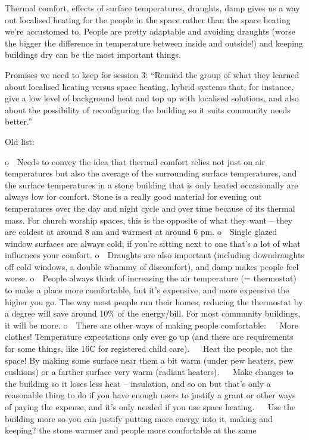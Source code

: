 \documentclass[letterpaper,10pt,english]{jupyterBook}
\begin{document}
\sphinxAtStartPar
Thermal comfort, effects of surface temperatures, draughts, damp \sphinxhyphen{} gives us a way out \sphinxhyphen{} localised heating for the people in the space rather than the space heating we’re accustomed to.  People are pretty adaptable and avoiding draughts (worse the bigger the difference in temperature between inside and outside!) and keeping buildings dry can be the most important things.

\sphinxAtStartPar
Promises we need to keep for session 3: “Remind the group of what they learned about localised heating versus space heating, hybrid systems that, for instance, give a low level of background heat and top up with localised solutions, and also about the possibility of reconfiguring the building so it suits community needs better.”

\sphinxAtStartPar
Old list:

\sphinxAtStartPar
o Needs to convey the idea that thermal comfort relies not just on air temperatures but also the average of the surrounding surface temperatures, and the surface temperatures in a stone building that is only heated occasionally are always low for comfort.  Stone is a really good material for evening out temperatures over the day and night cycle and over time because of its thermal mass.  For church worship spaces, this is the opposite of what they want – they are coldest at around 8 am and warmest at around 6 pm.
o Single glazed window surfaces are always cold; if you’re sitting next to one that’s a lot of what influences your comfort.
o Draughts are also important (including downdraughts off cold windows, a double whammy of discomfort), and damp makes people feel worse.
o People always think of increasing the air temperature (= thermostat) to make a place more comfortable, but it’s expensive, and more expensive the higher you go.  The way most people run their homes, reducing the thermostat by a degree will save around 10\% of the energy/bill.  For most community buildings, it will be more.
o There are other ways of making people comfortable:
 More clothes!  Temperature expectations only ever go up (and there are requirements for some things, like 16C for registered child care).
 Heat the people, not the space! By making some surface near them a bit warm (under pew heaters, pew cushions) or a farther surface very warm (radiant heaters).
 Make changes to the building so it loses less heat – insulation, and so on \sphinxhyphen{} but that’s only a reasonable thing to do if you have enough users to justify a grant or other ways of paying the expense, and it’s only needed if you use space heating.
 Use the building more so you can justify putting more energy into it, making and keeping? the stone warmer and people more comfortable at the same
\end{document}
